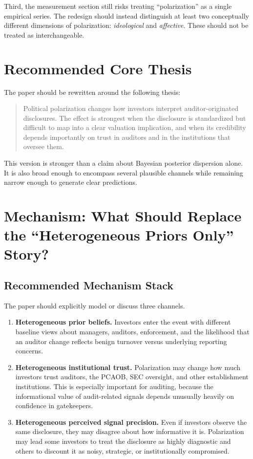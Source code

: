 \documentclass[12pt]{article}
\begin{document}
Third, the measurement section still risks treating ``polarization'' as a single empirical series. The redesign should instead distinguish at least two conceptually different dimensions of polarization: \emph{ideological} and \emph{affective}. These should not be treated as interchangeable.

\section{Recommended Core Thesis}

The paper should be rewritten around the following thesis:

\begin{quote}
Political polarization changes how investors interpret auditor-originated disclosures. The effect is strongest when the disclosure is standardized but difficult to map into a clear valuation implication, and when its credibility depends importantly on trust in auditors and in the institutions that oversee them.
\end{quote}

This version is stronger than a claim about Bayesian posterior dispersion alone. It is also broad enough to encompass several plausible channels while remaining narrow enough to generate clear predictions.

\section{Mechanism: What Should Replace the ``Heterogeneous Priors Only'' Story?}

\subsection{Recommended Mechanism Stack}

The paper should explicitly model or discuss three channels.

\begin{enumerate}[label=\textbf{M\arabic*.}]
    \item \textbf{Heterogeneous prior beliefs.} Investors enter the event with different baseline views about managers, auditors, enforcement, and the likelihood that an auditor change reflects benign turnover versus underlying reporting concerns.
    \item \textbf{Heterogeneous institutional trust.} Polarization may change how much investors trust auditors, the PCAOB, SEC oversight, and other establishment institutions. This is especially important for auditing, because the informational value of audit-related signals depends unusually heavily on confidence in gatekeepers.
    \item \textbf{Heterogeneous perceived signal precision.} Even if investors observe the same disclosure, they may disagree about how informative it is. Polarization may lead some investors to treat the disclosure as highly diagnostic and others to discount it as noisy, strategic, or institutionally compromised.
\end{enumerate}
\end{document}
